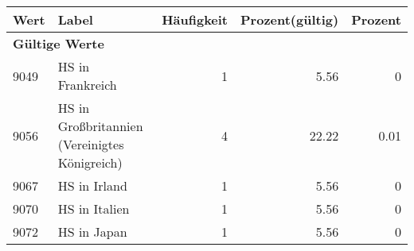      \begin{longtable}{lXrrr}
     \toprule
     \textbf{Wert} & \textbf{Label} & \textbf{Häufigkeit} & \textbf{Prozent(gültig)} & \textbf{Prozent} \\
     \endhead
     \midrule
     \multicolumn{5}{l}{\textbf{Gültige Werte}}\\

     9049 &
     \multicolumn{1}{X}{ HS in Frankreich   } &


       \num{1} &
       \num[round-mode=places,round-precision=2]{5.56} &
         \num[round-mode=places,round-precision=2]{0} \\

     9056 &
     \multicolumn{1}{X}{ HS in Großbritannien (Vereinigtes Königreich)   } &


       \num{4} &
       \num[round-mode=places,round-precision=2]{22.22} &
         \num[round-mode=places,round-precision=2]{0.01} \\

     9067 &
     \multicolumn{1}{X}{ HS in Irland   } &


       \num{1} &
       \num[round-mode=places,round-precision=2]{5.56} &
         \num[round-mode=places,round-precision=2]{0} \\

     9070 &
     \multicolumn{1}{X}{ HS in Italien   } &


       \num{1} &
       \num[round-mode=places,round-precision=2]{5.56} &
         \num[round-mode=places,round-precision=2]{0} \\

     9072 &
     \multicolumn{1}{X}{ HS in Japan   } &


       \num{1} &
       \num[round-mode=places,round-precision=2]{5.56} &
         \num[round-mode=places,round-precision=2]{0} \\


\end{longtable}
